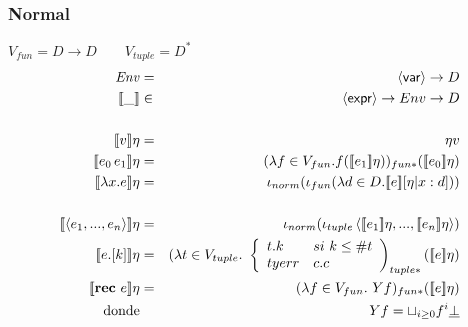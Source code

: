    \subsubsection{Normal}
      \PN $V_{fun} = D \rightarrow D \qquad V_{tuple} = D^{*}$
      \begin{eqnarray*}
        \Env &=& \var \to  D \\
        \llbracket\_\rrbracket &\in& \expr \to  Env \to  D \\ \\
        \llbracket v \rrbracket\eta &=& \eta v \\
        \llbracket e_0\, e_1\rrbracket\eta &=& (\lambda f \in V_{fun}. f(\se{e_1}\eta))_{fun*} (\se{e_0}\eta) \\
        \llbracket\lambda x.e\rrbracket\eta &=& \iota_{norm}(\iota_{fun}(\lambda d \in D. \se{e}[\eta|x:d])) \\ \\
        \se{\la e_1, ..., e_n \ra}\eta &=& \iota_{norm}(\iota_{tuple} \la \se{e_1}\eta, ..., \se{e_n}\eta \ra) \\
        \se{e.[k]}\eta &=& (\lambda t \in V_{tuple}. \ \left\lbrace 
        \begin{array}{lll}
          t.k & si \ k \leq \# t \\
          tyerr & c.c \\
        \end{array}\right)_{tuple*} (\se{e}\eta) \\
        \se{\textbf{rec}\  e} \eta &=& (\lambda f \in  V_{fun}.\ Y f)_{fun*} (\se{e}\eta ) \\
        \text{donde} && Y f = \sqcup_{i \geq 0} f^{i} \underline{\bot}
      \end{eqnarray*}
        
